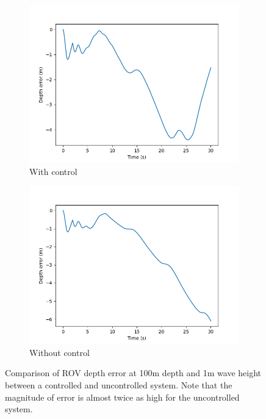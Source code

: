 \documentclass[class=article, crop=false]{standalone}
\begin{document}
\begin{figure}
    \centering
    \begin{subfigure}{0.8\textwidth}
        \centering
        \includegraphics{scenario1/rov-100m/1.0m/rov_depth_error_controlled}
        \caption{With control}
    \end{subfigure}
    \vfill
    \begin{subfigure}{0.8\textwidth}
        \centering
        \includegraphics{scenario1/rov-100m/1.0m/rov_depth_error_uncontrolled}
        \caption{Without control}
    \end{subfigure}
    \caption{Comparison of ROV depth error at 100m depth and 1m wave height between a controlled and uncontrolled system. Note that the magnitude of error is almost twice as high for the uncontrolled system.}
    \label{fig:depth_comparison}
\end{figure}
\end{document}
